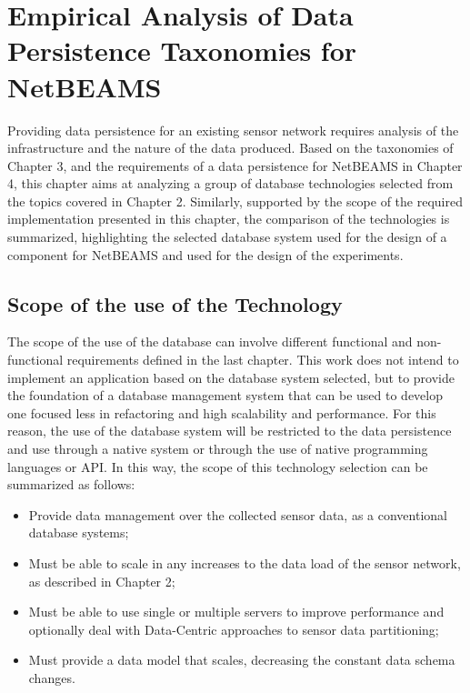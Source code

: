 
\setcounter{table}{1}
\chapter{Empirical Analysis of Data Persistence Taxonomies for NetBEAMS}

Providing data persistence for an existing sensor network requires analysis of
the infrastructure and the nature of the data produced. Based on the
taxonomies of Chapter 3, and the requirements of a data persistence for
NetBEAMS in Chapter 4, this chapter aims at analyzing a group of database
technologies selected from the topics covered in Chapter 2.
Similarly, supported by the scope of the required implementation presented in
this chapter, the comparison of the technologies is summarized, highlighting
the selected database system used for the design of a component for NetBEAMS
and used for the design of the experiments.

\section{Scope of the use of the Technology}

The scope of the use of the database can involve different functional and
non-functional requirements defined in the last chapter. This work does not
intend to implement an application based on the database system selected, but
to provide the foundation of a database management system that can be used to
develop one focused less in refactoring and high scalability and performance.
For this reason, the use of the database system will be restricted to the data
persistence and use through a native system or through the use of native
programming languages or API. In this way, the scope of this technology
selection can be summarized as follows:

\begin{itemize}
  \item Provide data management over the collected sensor data, as a
  conventional database systems;
  \item Must be able to scale in any increases to the data load of
  the sensor network, as described in Chapter 2;
  \item  Must be able to use single or multiple servers to improve performance
  and optionally deal with Data-Centric approaches to sensor data partitioning;
  \item Must provide a data model that scales, decreasing the constant data
  schema changes.
\end{itemize}

